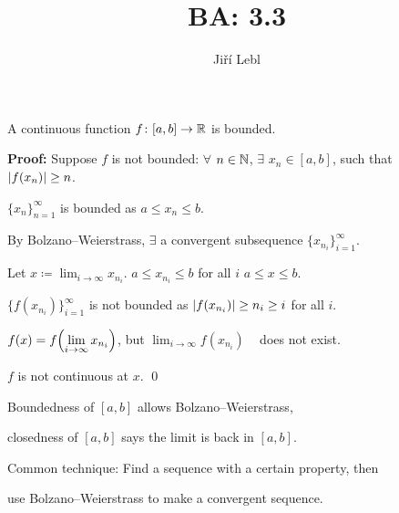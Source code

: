 \documentclass[10pt,aspectratio=169]{beamer}
\author{Ji\v{r}\'i Lebl}
\institute[OSU]{%
Departemento pri Matematiko de Oklahoma {\^S}tata Universitato}
\title{BA: 3.3}
\date{}
\begin{document}
\begin{frame}
\titlepage
\end{frame}

\begin{frame}
\begin{lemma}
A continuous function $f \colon [a,b] \to {\mathbb{R}}$ is bounded.
\end{lemma}

\pause
\textbf{Proof:}
Suppose $f$ is not bounded:
$\forall$
$n \in {\mathbb{N}}$, $\exists$ $x_n \in [a,b]$, such that
~ $\left\lvert {f(x_n)} \right\rvert \geq n$.

\pause
\medskip

$\{ x_n \}_{n=1}^\infty$ is bounded as $a \leq x_n \leq b$.

\pause
\medskip

By Bolzano--Weierstrass,
$\exists$ a convergent subsequence $\{ x_{n_i} \}_{i=1}^\infty$.

\pause
\medskip

Let $\displaystyle x \coloneqq \lim_{i \to \infty} x_{n_i}$.  \quad
$a \leq x_{n_i} \leq b$ for all $i$ \wthus $a \leq x \leq b$.

\pause
\medskip

$\{ f(x_{n_i}) \}_{i=1}^\infty$ is not bounded 
as 
$\left\lvert {f(x_{n_i})} \right\rvert \geq n_i \geq i$ for all $i$.

\pause
\medskip

$\displaystyle f(x)
=
f\Bigl( \lim_{i\to\infty} x_{n_i} \Bigr)$,
\pause
\qquad but \qquad
$\displaystyle \lim_{i\to\infty} f(x_{n_i})$ ~ does not exist.

\pause
\medskip

\thus
\quad $f$ is not continuous at $x$.
\qed

\pause
\medskip

Boundedness of $[a,b]$ allows Bolzano--Weierstrass,

closedness of $[a,b]$ says the limit is back in $[a,b]$.

\pause
\medskip

Common technique: Find a sequence with a certain property, then

use Bolzano--Weierstrass to make a convergent sequence.

\end{frame}
\end{document}
